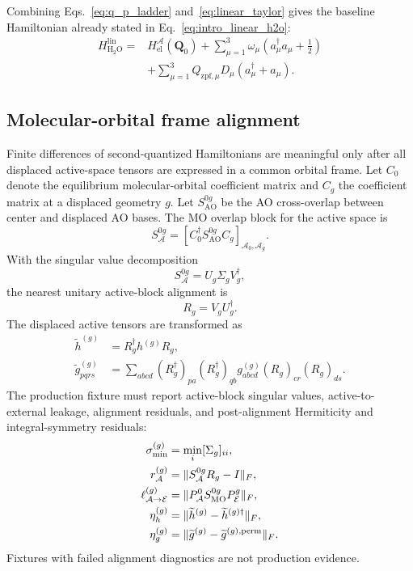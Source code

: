\documentclass[
  reprint,
  amsmath,
  amssymb,
  aps,
  pra,
  nofootinbib,
  superscriptaddress,
  floatfix
]{revtex4-2}
\newcommand{\Acal}{\mathcal{A}}
\newcommand{\Ecal}{\mathcal{E}}
\newcommand{\el}{\mathrm{el}}
\newcommand{\MO}{\mathrm{MO}}
\newcommand{\AO}{\mathrm{AO}}
\newcommand{\HtwoO}{\mathrm{H_2O}}
\newcommand{\lin}{\mathrm{lin}}
\newcommand{\zpf}{\mathrm{zpf}}
\begin{document}
Combining Eqs.~\eqref{eq:q_p_ladder} and~\eqref{eq:linear_taylor} gives the baseline Hamiltonian already stated in Eq.~\eqref{eq:intro_linear_h2o}:
\begin{align}
H_{\HtwoO}^{\lin}
={}&
H_{\el}^{\Acal}(\mathbf Q_0)
+
\sum_{\mu=1}^{3}
\omega_\mu
\left(a_\mu^\dagger a_\mu+\frac12\right)
\nonumber\\
&+
\sum_{\mu=1}^{3}
Q_{\zpf,\mu}D_\mu
\left(a_\mu^\dagger+a_\mu\right).
\label{eq:h2o_linear_final}
\end{align}

\subsection{Molecular-orbital frame alignment}

Finite differences of second-quantized Hamiltonians are meaningful only after all displaced active-space tensors are expressed in a common orbital frame.  Let \(C_0\) denote the equilibrium molecular-orbital coefficient matrix and \(C_g\) the coefficient matrix at a displaced geometry \(g\).  Let \(S_{\AO}^{0g}\) be the AO cross-overlap between center and displaced AO bases.  The MO overlap block for the active space is
\begin{equation}
S_{\Acal}^{0g}
=
\left[
C_0^\dagger S_{\AO}^{0g} C_g
\right]_{\Acal_0,\Acal_g}.
\label{eq:active_mo_overlap}
\end{equation}
With the singular value decomposition
\begin{equation}
S_{\Acal}^{0g}=U_g\Sigma_g V_g^\dagger ,
\label{eq:svd_alignment}
\end{equation}
the nearest unitary active-block alignment is
\begin{equation}
R_g=V_gU_g^\dagger .
\label{eq:procrustes_alignment}
\end{equation}
The displaced active tensors are transformed as
\begin{align}
\widetilde h^{(g)}
&=
R_g^\dagger h^{(g)}R_g,
\nonumber\\
\widetilde g^{(g)}_{pqrs}
&=
\sum_{abcd}
(R_g^\dagger)_{pa}
(R_g^\dagger)_{qb}
g^{(g)}_{abcd}
(R_g)_{cr}
(R_g)_{ds}.
\label{eq:tensor_alignment}
\end{align}
The production fixture must report active-block singular values, active-to-external leakage, alignment residuals, and post-alignment Hermiticity and integral-symmetry residuals:
\begin{align}
\sigma_{\min}^{(g)}
&=
\min_i [\Sigma_g]_{ii},
\nonumber\\
r_{\Acal}^{(g)}
&=
\|S_{\Acal}^{0g}R_g-I\|_F,
\nonumber\\
\ell_{\Acal\to\Ecal}^{(g)}
&=
\|P_{\Acal}^{0}S_{\MO}^{0g}P_{\Ecal}^{g}\|_F,
\nonumber\\
\eta_h^{(g)}
&=
\|\widetilde h^{(g)}-\widetilde h^{(g)\dagger}\|_F,
\nonumber\\
\eta_g^{(g)}
&=
\|\widetilde g^{(g)}-\widetilde g^{(g),{\rm perm}}\|_F .
\label{eq:alignment_diagnostics}
\end{align}
Fixtures with failed alignment diagnostics are not production evidence.
\end{document}
